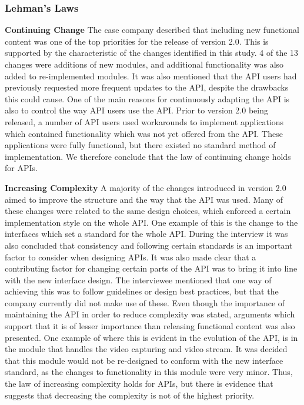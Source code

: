 \documentclass{sig-alternate}
\begin{document}
\subsubsection{Lehman's Laws}

\smallskip \noindent
\textbf{Continuing Change} 
The case company described that including new functional content was one of the top priorities for the release of version 2.0. This is supported by the characteristic of the changes identified in this study. 4 of the 13 changes were additions of new modules, and additional functionality was also added to re-implemented modules. It was also mentioned that the API users had previously requested more frequent updates to the API, despite the drawbacks this could cause. One of the main reasons for continuously adapting the API is also to control the way API users use the API. Prior to version 2.0 being released, a number of API users used workarounds to implement applications which contained functionality which was not yet offered from the API. These applications were fully functional, but there existed no standard method of implementation. We therefore conclude that the law of continuing change holds for APIs. 

\smallskip \noindent
\textbf{Increasing Complexity} \label{sec:law2} 
A majority of the changes introduced in version 2.0 aimed to improve the structure and the way that the API was used. Many of these changes were related to the same design choices, which enforced a certain implementation style on the whole API. One example of this is the change to the interfaces which set a standard for the whole API. During the interview it was also concluded that consistency and following certain standards is an important factor to consider when designing APIs. It was also made clear that a contributing factor for changing certain parts of the API was to bring it into line with the new interface design. The interviewee mentioned that one way of achieving this was to follow guidelines or design best practices, but that the company currently did not make use of these. Even though the importance of maintaining the API in order to reduce complexity was stated, arguments which support that it is of lesser importance than releasing functional content was also presented. One example of where this is evident in the evolution of the API, is in the module that handles the video capturing and video stream. It was decided that this module would not be re-designed to conform with the new interface standard, as the changes to functionality in this module were very minor. Thus, the law of increasing complexity holds for APIs, but there is evidence that suggests that decreasing the complexity is not of the highest priority. 
\end{document}
